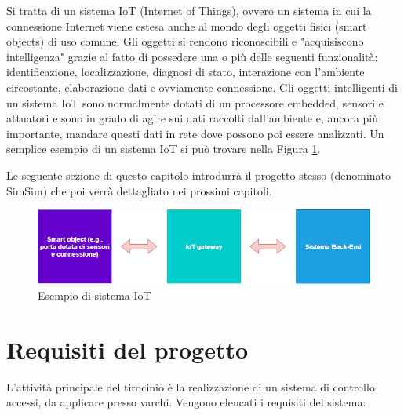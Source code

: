 \documentclass[12pt]{report}
\begin{document}
Si tratta di un sistema IoT (Internet of Things), ovvero un sistema in cui la connessione Internet viene estesa anche al mondo degli oggetti fisici (smart objects\cite{smart_objects}) di uso comune. Gli oggetti si rendono riconoscibili e "acquisiscono intelligenza" grazie al fatto di possedere una o più delle seguenti funzionalità: identificazione, localizzazione, diagnosi di stato, interazione con l'ambiente circostante, elaborazione dati e ovviamente connessione.
Gli oggetti intelligenti di un sistema IoT sono normalmente dotati di un processore embedded, sensori e attuatori e sono in grado di agire sui dati raccolti dall'ambiente e, ancora più importante, mandare questi dati in rete dove possono poi essere analizzati\cite{IoT}. Un semplice esempio di un sistema IoT si può trovare nella Figura \ref{fig:iot_diagram}.

Le seguente sezione di questo capitolo introdurrà il progetto stesso (denominato SimSim) che poi verrà dettagliato nei prossimi capitoli.

\begin{figure}
	\includegraphics[width=\linewidth]{./img/iot_diagram.png}
	\caption{Esempio di sistema IoT}
	\label{fig:iot_diagram}
\end{figure}


%
\section{Requisiti del progetto}\label{sec:req}
%

L'attività principale del tirocinio è la realizzazione di un sistema di controllo accessi, da applicare presso varchi. Vengono elencati i requisiti del sistema:
\end{document}
